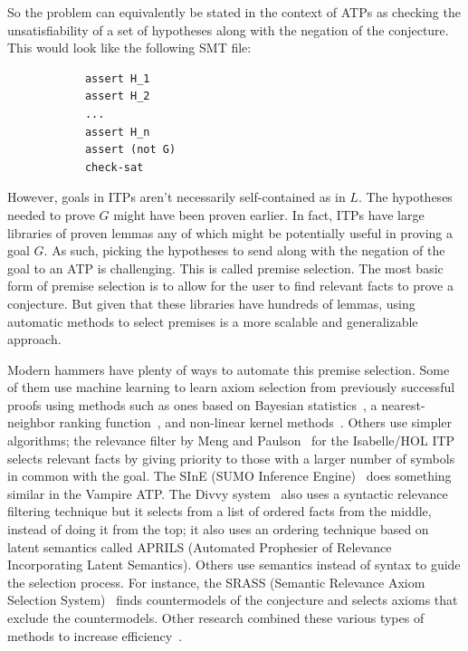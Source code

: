 \documentclass{article}
\begin{document}
		So the problem can equivalently be stated in the context of ATPs
		as checking the unsatisfiability of a set of hypotheses 
		along with the negation of the conjecture. This would look 
		like the following SMT file:
		\begin{verbatim}
			assert H_1
			assert H_2
			...
			assert H_n
			assert (not G)
			check-sat
		\end{verbatim}
		However, goals in ITPs aren't necessarily self-contained 
		as in $L$. The hypotheses needed to prove $G$ 
		might have been proven earlier. In fact, ITPs have large
		libraries of proven lemmas any of which might be potentially 
		useful in proving a goal $G$. As such, picking
		the hypotheses to send along with the negation of the 
		goal to an ATP is challenging. This is called premise 
		selection. The most basic form of premise selection 
		is to allow for the user to find relevant facts 
		to prove a conjecture. But given that these libraries 
		have hundreds of lemmas, using automatic methods 
		to select premises is a more scalable and 
		generalizable approach.
	
		Modern hammers have plenty of ways to 
		automate this premise selection. Some of them use 
		machine learning to learn axiom selection from 
		previously successful proofs using methods such as 
		ones based on Bayesian 
		statistics~\cite{DBLP:journals/jar/AlamaHKTU14}, 
		a nearest-neighbor ranking 
		function~\cite{DBLP:conf/cade/KaliszykU13a}, and
		non-linear kernel
		methods~\cite{DBLP:journals/jar/AlamaHKTU14}.
		Others use simpler algorithms; the relevance filter 
		by Meng and Paulson~\cite{DBLP:journals/japll/MengP09}
		for the Isabelle/HOL ITP selects relevant facts by 
		giving priority to those with a larger number of 
		symbols in common with the goal. The SInE 
		(SUMO Inference 
		Engine)~\cite{10.1007/978-3-642-22438-6_23} does
		something similar in the Vampire ATP. The Divvy 
		system~\cite{10.1007/978-3-642-02959-2_13} also 
		uses a syntactic relevance filtering technique but 
		it selects from a list of ordered facts from the 
		middle, instead of doing it from the top; it
		also uses an ordering technique based 
		on latent semantics called APRILS (Automated 
		Prophesier of Relevance Incorporating Latent 
		Semantics). Others use semantics instead of 
		syntax to guide	the selection process. For 
		instance, the SRASS (Semantic Relevance Axiom 
		Selection 
		System)~\cite{10.1007/978-3-540-73595-3_20} 
		finds countermodels of the conjecture and selects 
		axioms that	exclude the countermodels. Other research combined these various types of methods to increase efficiency~\cite{DBLP:journals/corr/KaliszykU13b, 
		10.1007/978-3-642-31365-3_30}.
		
\end{document}
